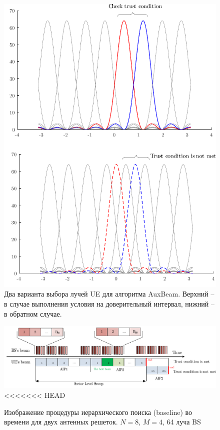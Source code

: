 \begin{figure}[ht]
    \centering
    \includegraphics{figs/fig4.16}
    \caption{Два варианта выбора лучей UE для алгоритма AuxBeam. Верхний -- в случае выполнения условия на доверительный интервал, нижний -- в обратном случае.}
    \label{<label>}
\end{figure}


\begin{figure}[ht]
    \centering
    \includegraphics[width=\linewidth]{figs/fig4.17}
<<<<<<< HEAD
    \caption{Изображение процедуры иерархического поиска (baseline) во времени для двух антенных решеток. $N=8$, $M=4$, 64 луча BS}
    \label{fig:4.9}
\end{figure}

